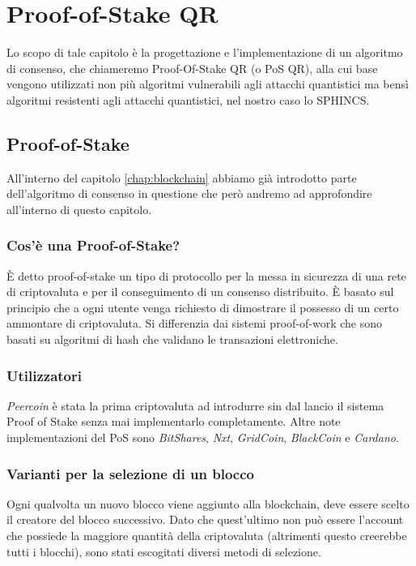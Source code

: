 \chapter{Proof-of-Stake QR}
Lo scopo di tale capitolo è la progettazione e l'implementazione di un algoritmo di consenso, che chiameremo Proof-Of-Stake QR (o PoS QR), alla cui base vengono utilizzati non più algoritmi vulnerabili agli attacchi quantistici ma bensì algoritmi resistenti agli attacchi quantistici, nel nostro caso lo SPHINCS.

\section{Proof-of-Stake}
All'interno del capitolo \ref{chap:blockchain} abbiamo già introdotto parte dell'algoritmo di consenso in questione che però andremo ad approfondire all'interno di questo capitolo.

\subsection{Cos'è una Proof-of-Stake?}
È detto proof-of-stake un tipo di protocollo per la messa in sicurezza di una rete di criptovaluta e per il conseguimento di un consenso distribuito. È basato sul principio che a ogni utente venga richiesto di dimostrare il possesso di un certo ammontare di criptovaluta. Si differenzia dai sistemi proof-of-work che sono basati su algoritmi di hash che validano le transazioni elettroniche.

\subsection{Utilizzatori}
\textit{Peercoin} è stata la prima criptovaluta ad introdurre sin dal lancio il sistema Proof of Stake senza mai implementarlo completamente. Altre note implementazioni del PoS sono \textit{BitShares}, \textit{Nxt}, \textit{GridCoin}, \textit{BlackCoin} e \textit{Cardano}.

\subsection{Varianti per la selezione di un blocco}
Ogni qualvolta un nuovo blocco viene aggiunto alla blockchain, deve essere scelto il creatore del blocco successivo. Dato che quest'ultimo non può essere l'account che possiede la maggiore quantità della criptovaluta (altrimenti questo creerebbe tutti i blocchi), sono stati escogitati diversi metodi di selezione.

